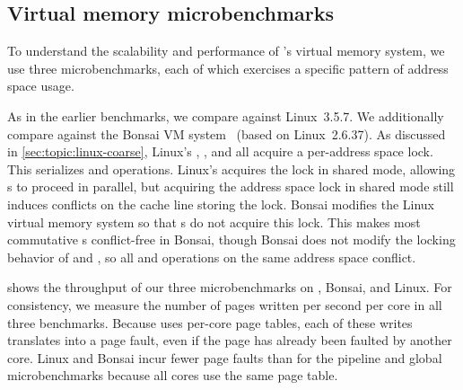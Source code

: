 
%   

\begin{comment}
\begin{figure}
  \centering
  
  \caption{Scalability of $n$ cores forking and exiting a process on xv6
    and Linux.}
  \label{fig:forktest}
\end{figure}
\end{comment}


\subsection{Virtual memory microbenchmarks}

To understand the scalability and performance of \sys's \vm virtual
memory system, we use three microbenchmarks, each of which exercises a
specific pattern of address space usage.

As in the earlier benchmarks, we compare \vm against Linux~3.5.7.  We
additionally compare against the Bonsai VM
system~\cite{clements:bonsai} (based on Linux~2.6.37).
%
As discussed in \cref{sec:topic:linux-coarse}, Linux's
, , and  all acquire a
per-address space lock.  This serializes  and 
operations.  Linux's  acquires the lock in shared
mode, allowing s to proceed in parallel, but acquiring
the address space lock in shared mode still induces conflicts on the
cache line storing the lock.
%
Bonsai modifies the Linux virtual memory system so that
s do not acquire this lock.  This makes most
commutative s conflict-free in Bonsai, though Bonsai
does not modify the locking behavior of  and ,
so all  and  operations on the same address
space conflict.

 shows the throughput of our three microbenchmarks
on \sys, Bonsai, and Linux.
%
For consistency, we measure the number of pages written per second per
core in all three benchmarks.
%
Because \sys uses per-core page tables, each of these writes
translates into a page fault, even if the page has already been
faulted by another core.
%
Linux and Bonsai incur fewer page faults than \sys for the pipeline
and global microbenchmarks because all cores use the same page table.

